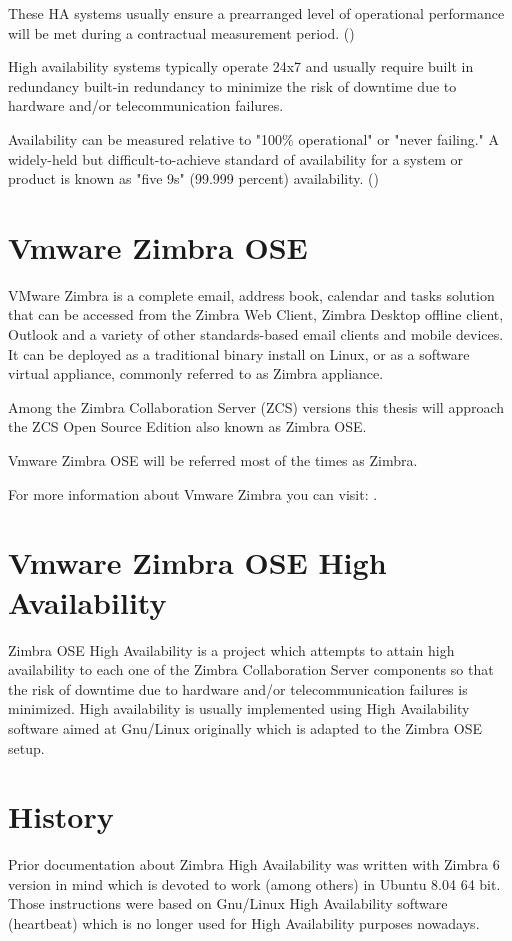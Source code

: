 These HA systems usually ensure a prearranged level of operational performance will be met during a contractual measurement period. (\cite{WikipediaHA})

High availability systems typically operate 24x7 and usually require built in redundancy built-in redundancy to minimize the risk of downtime due to hardware and/or telecommunication failures. 

Availability can be measured relative to "100\% operational" or "never failing." A widely-held but difficult-to-achieve standard of availability for a system or product is known as "five 9s" (99.999 percent) availability. (\cite{BCMHA})


\section {Vmware Zimbra OSE}
VMware Zimbra is a complete email, address book, calendar and tasks solution that can be accessed from the Zimbra Web Client, Zimbra Desktop offline client, Outlook and a variety of other standards-based email clients and mobile devices. It can be deployed as a traditional binary install on Linux, or as a software virtual appliance, commonly referred to as Zimbra appliance.

Among the Zimbra Collaboration Server (ZCS) versions this thesis will approach the ZCS Open Source Edition also known as Zimbra OSE.

Vmware Zimbra OSE will be referred most of the times as Zimbra.

For more information about Vmware Zimbra you can visit: \cite{ZimbraLearn}.

\section {Vmware Zimbra OSE High Availability}
Zimbra OSE High Availability is a project which attempts to attain high availability to each one of the Zimbra Collaboration Server components so that the risk of downtime due to hardware and/or telecommunication failures is minimized. High availability is usually implemented using High Availability software aimed at Gnu/Linux originally which is adapted to the Zimbra OSE setup.


\section{\label{sec:history}History}

Prior documentation about Zimbra High Availability was written with Zimbra 6 version in mind which is devoted to work (among others) in Ubuntu 8.04 64 bit. Those instructions were based on Gnu/Linux High Availability software (heartbeat) which is no longer used for High Availability purposes nowadays.

